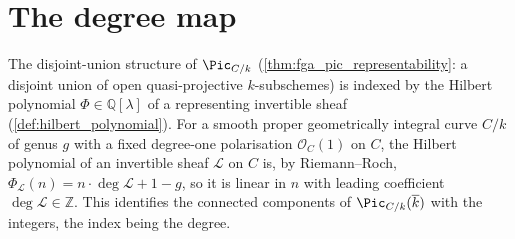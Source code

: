 \section{The degree map}
\label{sec:pic_degree}

The disjoint-union structure of \(\Pic_{C/k}\)
(\cref{thm:fga_pic_representability}: a disjoint union of open
quasi-projective \(k\)-subschemes) is indexed by the Hilbert polynomial
\(\Phi \in \mathbb{Q}[\lambda]\) of a representing invertible sheaf
(\cref{def:hilbert_polynomial}). For a smooth proper geometrically
integral curve \(C/k\) of genus \(g\) with a fixed degree-one polarisation
\(\mathcal{O}_C(1)\) on \(C\), the Hilbert polynomial of an invertible
sheaf \(\mathcal{L}\) on \(C\) is, by Riemann--Roch,
\(\Phi_{\mathcal{L}}(n) = n \cdot \deg \mathcal{L} + 1 - g\), so it is
linear in \(n\) with leading coefficient \(\deg \mathcal{L} \in
\mathbb{Z}\). This identifies the connected components of
\(\Pic_{C/k}(\overline k)\) with the integers, the index being the
degree.


